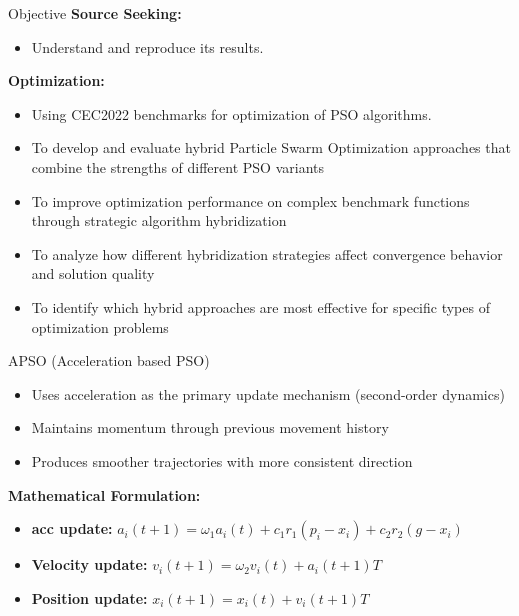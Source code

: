 \documentclass[aspectratio=169]{beamer}
\begin{document}
\begin{frame}{Objective}
\textbf{Source Seeking:}
    \begin{itemize}
        \item Understand \cite{10312321} and reproduce its results.
    \end{itemize}

\textbf{Optimization:}
    \begin{itemize}
        \item Using CEC2022 benchmarks \cite{luo2022benchmarkfunctionscec2022} for optimization of \cite{10312321} PSO algorithms.
        \item To develop and evaluate hybrid Particle Swarm Optimization approaches that combine the strengths of different PSO variants
        \item To improve optimization performance on complex benchmark functions through strategic algorithm hybridization
        \item To analyze how different hybridization strategies affect convergence behavior and solution quality
        \item To identify which hybrid approaches are most effective for specific types of optimization problems
    \end{itemize}
    
\end{frame}

\begin{frame}{APSO (Acceleration based PSO)}
    \begin{itemize}
        \item Uses acceleration as the primary update mechanism (second-order dynamics)
        \item Maintains momentum through previous movement history
        \item Produces smoother trajectories with more consistent direction
    \end{itemize}
    
    \textbf{Mathematical Formulation:} \\
    \begin{itemize}
        \item \textbf{acc update:} $a_i(t+1) = \omega_{1} a
    _i(t) + c_1 r_1(p_i - x_i) + c_2r_2(g-x_i)$
        \item \textbf{Velocity update:} $v_i(t+1) = \omega_2v_i(t) + a_i(t+1)T$
        \item \textbf{Position update:} $x_i(t+1) = x_i(t) + v_i(t+1)T$
    \end{itemize}
\end{frame}
\end{document}
